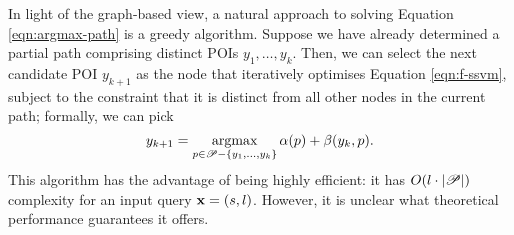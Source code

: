 
In light of the graph-based view, a natural approach to solving Equation \ref{eqn:argmax-path} is a greedy algorithm.
Suppose we have already determined a partial path comprising distinct POIs $y_1, \ldots, y_k$.
Then, we can select the next candidate POI $y_{k + 1}$ as
the node
that iteratively optimises Equation \ref{eqn:f-ssvm},
subject to the constraint that it is distinct from all other nodes in the current path;
formally, we can pick
$$ y_{k + 1} = \operatorname*{argmax}_{p \in \mathscr{P} - \{ y_1, \ldots, y_k \}} \alpha( p ) + \beta( y_k, p ). $$
This algorithm has the advantage of being highly efficient: it has $O(l \cdot | \mathscr{P} |)$ complexity for an input query $\mathbf{x} = (s, l)$.
However, it is unclear what theoretical performance guarantees it offers.
